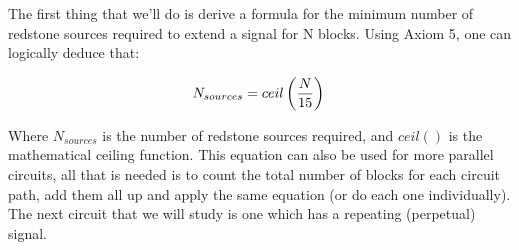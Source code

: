 \documentclass{article}
\begin{document}
\noindent
The first thing that we'll do is derive a formula for the minimum number of redstone sources required to extend a signal for N blocks. Using Axiom 5, one can logically deduce that:

\begin{equation}
    N_{sources} = ceil \left( \frac{N}{15} \right) \\
\end{equation}

\noindent
Where $N_{sources}$ is the number of redstone sources required, and $ceil()$ is the mathematical ceiling function. This equation can also be used for more parallel circuits, all that is needed is to count the total number of blocks for each circuit path, add them all up and apply the same equation (or do each one individually). \\

\noindent
The next circuit that we will study is one which has a repeating (perpetual) signal.
\end{document}
